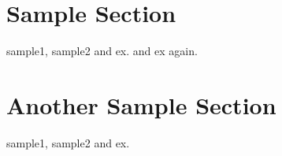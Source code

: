 \documentclass[12pt]{article}
\begin{document}
\section{Sample Section}


\Gls{sample1}, \gls{sample2} and \gls{ex}.
 and \gls{ex} again.


\section{Another Sample Section}


\Gls{sample1}, \gls{sample2} and \gls{ex}.


\printglossaries 
\end{document}
